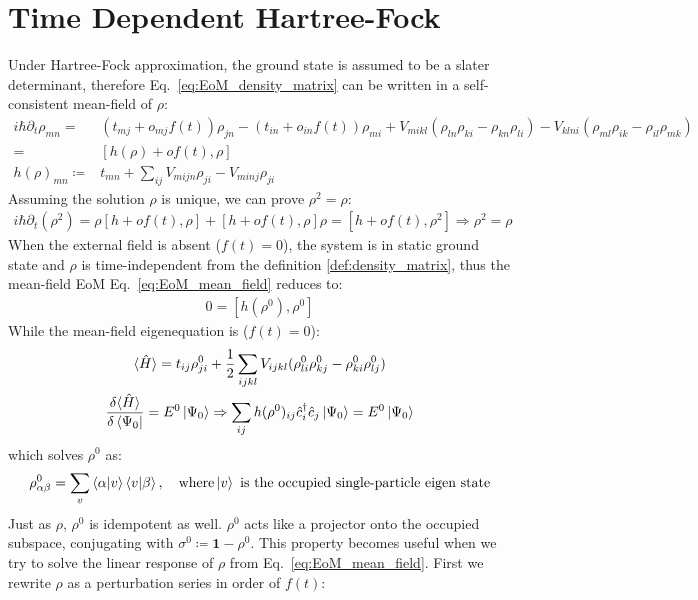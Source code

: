 \documentclass[11pt,letterpaper]{article}
\theoremstyle{definition}
\theoremstyle{plain}
\theoremstyle{remark}
\newcommand{\avg}[1]{\langle #1 \rangle}%
\begin{document}
\section{Time Dependent Hartree-Fock}
Under Hartree-Fock approximation, the ground state is assumed to be a slater determinant, therefore Eq.~\eqref{eq:EoM_density_matrix} can be written in a self-consistent mean-field of $\rho$:
\begin{align}
    i\hbar \partial_t \rho_{mn} =& (t_{mj} + o_{mj} f(t)) \rho_{jn} - (t_{in} + o_{in} f(t)) \rho_{mi} + V_{mikl} (\rho_{ln}\rho_{ki} - \rho_{kn}\rho_{li}) - V_{klni} (\rho_{ml}\rho_{ik} - \rho_{il}\rho_{mk}) \nonumber \\
    =& [h(\rho)+of(t), \rho] \label{eq:EoM_mean_field} \\
    h(\rho)_{mn} \coloneqq& t_{mn} + \sum_{ij}V_{mijn} \rho_{ji} - V_{minj} \rho_{ji}
\end{align}
Assuming the solution $\rho$ is unique, we can prove $\rho^2 = \rho$:
\begin{gather}
    i \hbar \partial_t (\rho^2) = \rho [h+of(t), \rho] + [h+of(t), \rho] \rho = [h+of(t), \rho^2] \Rightarrow \rho^2 = \rho
\end{gather}
When the external field is absent ($f(t)=0$), the system is in static ground state and $\rho$ is time-independent from the definition \eqref{def:density_matrix}, thus the mean-field EoM Eq.~\eqref{eq:EoM_mean_field} reduces to:
\begin{gather}
    0 = [h(\rho^0), \rho^0]
\end{gather}
While the mean-field eigenequation is ($f(t) = 0$):
\begin{gather}
    \avg{\hat{H}} = t_{ij} \rho^0_{ji} + \frac{1}{2} \sum_{ijkl} V_{ijkl} (\rho^0_{li} \rho^0_{kj} - \rho^0_{ki} \rho^0_{lj}) \\
    \frac{\delta \avg{\hat{H}}}{\delta \bra{\Psi_0}} = E^0 \ket{\Psi_0} \Rightarrow \sum_{ij} h(\rho^0)_{ij} \hat{c}^\dagger_i \hat{c}_j \ket{\Psi_0} = E^0 \ket{\Psi_0}
\end{gather}
which solves $\rho^0$ as:
\begin{gather}
    \rho^0_{\alpha \beta} = \sum_{v} \bra{\alpha} \ket{v} \bra{v} \ket{\beta}, \quad \text{where} \ket{v} \text{ is the occupied single-particle eigen state}
\end{gather}
Just as $\rho$, $\rho^0$ is idempotent as well. $\rho^0$ acts like a projector onto the occupied subspace, conjugating with $\sigma^0 \coloneqq \bm{1} - \rho^0$. This property becomes useful when we try to solve the linear response of $\rho$ from Eq.~\eqref{eq:EoM_mean_field}. First we rewrite $\rho$ as a perturbation series in order of $f(t)$:
\end{document}
